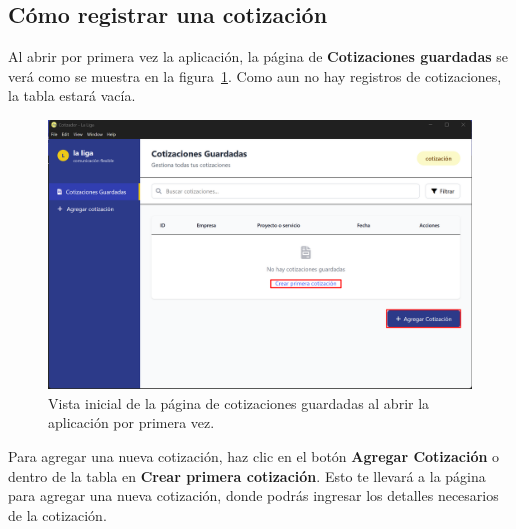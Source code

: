 \documentclass{Pretexto/bluereport}
\begin{document}
\subsection{Cómo registrar una cotización}
Al abrir por primera vez la aplicación, la página de \textbf{Cotizaciones guardadas} se verá como se muestra en la figura~\ref{fig:vista_inicial}.
Como aun no hay registros de cotizaciones, la tabla estará vacía. 
    \begin{figure}[H]
        \centering
            \includegraphics[width=0.85\linewidth]{img/abrir_primera_vez.png}
        \caption{Vista inicial de la página de cotizaciones guardadas al abrir la aplicación por primera vez.}
        \label{fig:vista_inicial}
    \end{figure}
Para agregar una nueva cotización, haz clic en el botón \textbf{Agregar Cotización} o dentro de
la tabla en \textbf{Crear primera cotización}. Esto te llevará a la página para agregar una nueva cotización, donde podrás ingresar los 
detalles necesarios de la cotización.
\end{document}
